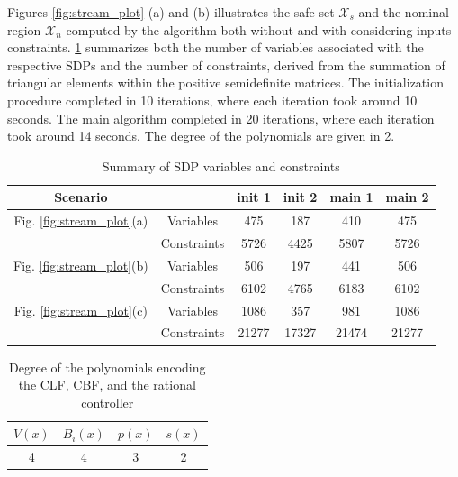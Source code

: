 \documentclass[lettersize,journal]{IEEEtran}
\begin{document}
Figures \ref{fig:stream_plot} (a) and (b) illustrates the safe set $\mathcal X_s$ and the nominal region $\mathcal X_n$ computed by the algorithm both without and with considering inputs constraints.
\cref{tab:number_of_var_and_constr} summarizes both the number of variables associated with the respective SDPs and the number of constraints, derived from the summation of triangular elements within the positive semidefinite matrices.
The initialization procedure completed in 10 iterations, where each iteration took around 10 seconds.
The main algorithm completed in 20 iterations, where each iteration took around 14 seconds.
The degree of the polynomials are given in \cref{tab:polynomial_degrees}.

\begin{table}[!t]
   \caption{Summary of SDP variables and constraints}
   \label{tab:number_of_var_and_constr}
   \centering
   \begin{tabular}{||cccccc||} 
      \hline
      Scenario & & init 1 & init 2 & main 1 & main 2 \\ \hline\hline
      Fig. \ref{fig:stream_plot}(a) & Variables & 475 & 187 & 410 & 475 \\
      & Constraints & 5726 & 4425 & 5807 & 5726 \\ \hline
      Fig. \ref{fig:stream_plot}(b) & Variables & 506 & 197 & 441 & 506 \\
      & Constraints & 6102 & 4765 & 6183 & 6102 \\ \hline
      Fig. \ref{fig:stream_plot}(c) & Variables & 1086 & 357 & 981 & 1086 \\
      & Constraints & 21277 & 17327 & 21474 & 21277 \\ \hline
   \end{tabular}
\end{table}
\begin{table}[!t]
   \caption{Degree of the polynomials encoding the CLF, CBF, and the rational controller}
   \label{tab:polynomial_degrees}
   \centering
   \begin{tabular}{||c@{\hskip 0.04in} c@{\hskip 0.04in} c@{\hskip 0.04in} c||} \hline
      $V(x)$ & $B_i(x)$ & $p(x)$ & $s(x)$ \\ \hline\hline
      4 & 4 & 3 & 2 \\ \hline
   \end{tabular}
\end{table}
\end{document}
